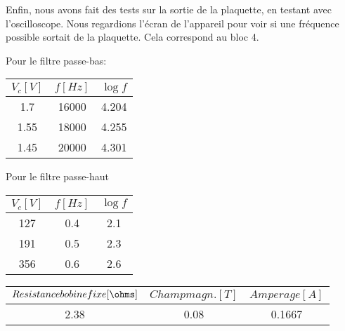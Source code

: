 Enfin, nous avons fait des tests sur la sortie de la plaquette, en testant avec l'oscilloscope.  Nous regardions l'écran de
l'appareil pour voir si une fréquence possible sortait de la plaquette.  Cela correspond au bloc 4.



Pour le filtre passe-bas:
\begin{center}
\begin{tabular}{|c|c|c|}
\hline
$V_c[V]$ & $f[Hz]$ & $\log{f}$ \\
\hline
1.7 & 16000 & 4.204 \\
\hline
1.55 & 18000 & 4.255 \\
\hline
1.45 & 20000 & 4.301 \\
\hline
\end{tabular}
\end{center}

Pour le filtre passe-haut

\begin{center}
	\begin{tabular}{|c|c|c|}
		\hline
		$V_c[V]$ & $f[Hz]$ & $\log{f}$ \\
		\hline
		127 & 0.4 & 2.1\\
		\hline
		191 & 0.5 & 2.3\\
		\hline
		356 & 0.6 & 2.6 \\
		\hline
	\end{tabular}
\end{center}

\begin{center}
	\begin{tabular}{|c|c|c|}
		\hline
		$Resistance bobine fixe[\ohms]$ & $Champ magn.[T]$ & $Amperage[A]$ \\
		\hline
		2.38 & 0.08 & 0.1667\\
		\hline
	\end{tabular}
\end{center}




